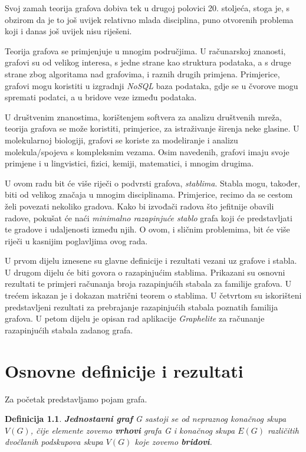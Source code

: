 \documentclass[times, utf8, zavrsni]{fer}
\newtheorem{definition}{Definicija}[chapter]
\begin{document}
Svoj zamah teorija grafova dobiva tek u drugoj polovici 20. stoljeća, stoga je, s obzirom da je to još uvijek relativno mlada disciplina, puno otvorenih problema koji i danas još uvijek nisu riješeni.

Teorija grafova se primjenjuje u mnogim područjima. U računarskoj znanosti, grafovi su od velikog interesa, s jedne strane kao struktura podataka, a s druge strane zbog algoritama nad grafovima, i raznih drugih primjena. Primjerice, grafovi mogu koristiti u izgradnji \textit{NoSQL} baza podataka, gdje se u čvorove mogu spremati podatci, a u bridove veze između podataka.

U društvenim znanostima, korištenjem softvera za analizu društvenih mreža, teorija grafova se može koristiti, primjerice, za istraživanje širenja neke glasine. U molekularnoj biologiji, grafovi se koriste za modeliranje i analizu molekula/spojeva s kompleksnim vezama. Osim navedenih, grafovi imaju svoje primjene i u lingvistici, fizici, kemiji, matematici, i mnogim drugima.

U ovom radu bit će više riječi o podvrsti grafova, \textit{stablima}. Stabla mogu, također, biti od velikog značaja u mnogim disciplinama. Primjerice, recimo da se cestom želi povezati nekoliko gradova. Kako bi izvođači radova što jefitnije obavili radove, pokušat će naći \textit{minimalno razapinjuće stablo} grafa koji će predstavljati te gradove i udaljenosti između njih. O ovom, i sličnim problemima, bit će više riječi u kasnijim poglavljima ovog rada.

U prvom dijelu iznesene su glavne definicije i rezultati vezani uz grafove i stabla. U drugom dijelu će biti govora o razapinjućim stablima. Prikazani su osnovni rezultati te primjeri računanja broja razapinjućih stabala za familije grafova. 
U trećem iskazan je i dokazan matrični teorem o stablima.
U četvrtom su iskorišteni predstavljeni rezultati za prebrajanje razapinjućih stabala poznatih familija grafova. U petom dijelu je opisan rad aplikacije \textit{Graphelite} za računanje razapinjućih stabala zadanog grafa.

\chapter{Osnovne definicije i rezultati}

Za početak predstavljamo pojam grafa.

\begin{definition}
	\textbf{Jednostavni graf} G sastoji se od nepraznog konačnog skupa $V(G)$, čije elemente zovemo \textbf{vrhovi} grafa G i konačnog skupa $E(G)$ različitih dvočlanih podskupova skupa $V(G)$ koje zovemo \textbf{bridovi}.
\end{definition}
\end{document}
